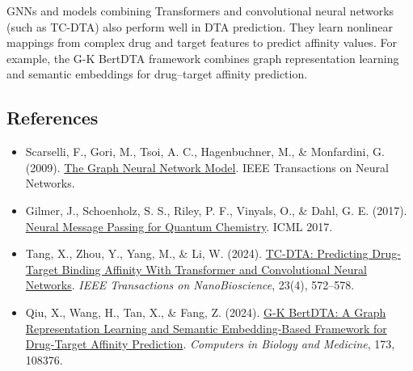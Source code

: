 GNNs and models combining Transformers and convolutional neural networks (such as TC-DTA) also perform well in DTA prediction. They learn nonlinear mappings from complex drug and target features to predict affinity values. For example, the G-K BertDTA framework combines graph representation learning and semantic embeddings for drug--target affinity prediction.

\FloatBarrier
{}
\hypertarget{references-41}{%
\subsection{References}\label{references-41}}

\vspace{0.25em}
\begin{itemize}
\tightlist
\item
  Scarselli, F., Gori, M., Tsoi, A. C., Hagenbuchner, M., \& Monfardini, G. (2009). \href{https://doi.org/10.1109/TNN.2008.2005605}{The Graph Neural Network Model}. IEEE Transactions on Neural Networks.
\item
  Gilmer, J., Schoenholz, S. S., Riley, P. F., Vinyals, O., \& Dahl, G. E. (2017). \href{https://proceedings.mlr.press/v70/gilmer17a.html}{Neural Message Passing for Quantum Chemistry}. ICML 2017.
\item
  Tang, X., Zhou, Y., Yang, M., \& Li, W. (2024). \href{https://doi.org/10.1109/TNB.2024.3441590}{TC-DTA: Predicting Drug-Target Binding Affinity With Transformer and Convolutional Neural Networks}. \emph{IEEE Transactions on NanoBioscience}, 23(4), 572--578.
\item
  Qiu, X., Wang, H., Tan, X., \& Fang, Z. (2024). \href{https://doi.org/10.1016/j.compbiomed.2024.108376}{G-K BertDTA: A Graph Representation Learning and Semantic Embedding-Based Framework for Drug-Target Affinity Prediction}. \emph{Computers in Biology and Medicine}, 173, 108376.
\end{itemize}

\clearpage
